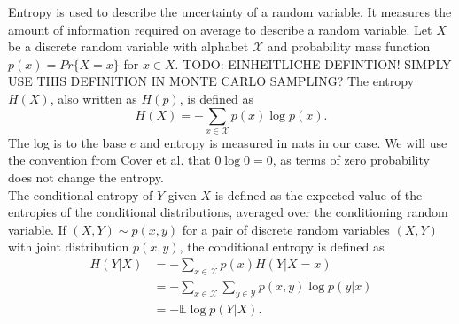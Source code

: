 Entropy is used to describe the uncertainty of a random variable. It measures the amount of information required on average to describe a random variable. Let $X$ be a discrete random variable with alphabet $\mathcal{X}$ and probability mass function $p(x)=Pr\{X=x\}$ for $x\in X$. TODO: EINHEITLICHE DEFINTION! SIMPLY USE THIS DEFINITION IN MONTE CARLO SAMPLING?
The entropy $H(X)$, also written as $H(p)$, is defined as
\begin{equation}
    H(X) = -\sum_{x \in \mathcal{X}} p(x) \log p(x).
\end{equation}
The log is to the base $e$ and entropy is measured in nats in our case. We will use the convention from Cover et al. \cite{Cover2005} that $0 \log 0 = 0$, as terms of zero probability does not change the entropy. %
\\
The conditional entropy of $Y$ given $X$ is defined as the expected value of the entropies of the conditional distributions, averaged over the conditioning random variable. If $(X,Y) \sim p(x,y)$ for a pair of discrete random variables $(X,Y)$ with joint distribution $p(x,y)$, the conditional entropy is defined as
\begin{align}
    H(Y|X)&= -\sum_{x \in \mathcal{X}} p(x) H(Y|X=x) \\
    &= - \sum_{x \in \mathcal{X}} \sum_{y \in \mathcal{Y}}p(x,y) \log p(y|x) \\
    &= -\mathbb{E} \log p(Y|X).
\end{align}

